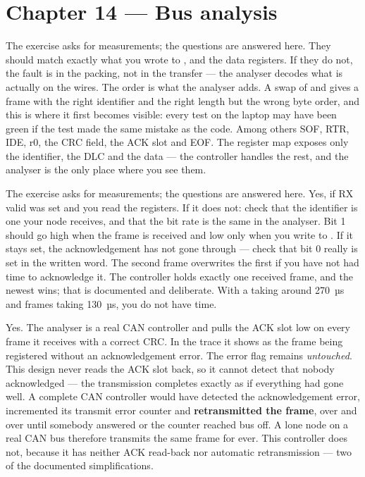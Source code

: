\section*{Chapter 14 --- Bus analysis}

The exercise asks for measurements; the questions are answered here.
 They should match exactly what you wrote to ,  and the data
registers. If they do not, the fault is in the packing, not in the transfer --- the analyser
decodes what is actually on the wires.
 The order is what the analyser adds. A swap of  and 
gives a frame with the right identifier and the right length but the wrong byte order, and this is
where it first becomes visible: every test on the laptop may have been green if the test made the
same mistake as the code.
 Among others SOF, RTR, IDE, r0, the CRC field, the ACK slot and EOF. The register map
exposes only the identifier, the DLC and the data --- the controller handles the rest, and the
analyser is the only place where you see them.

The exercise asks for measurements; the questions are answered here.
 Yes, if RX valid was set and you read the registers. If it does not: check that the
identifier is one your node receives, and that the bit rate is the same in the analyser.
 Bit 1 should go high when the frame is received and low only when you write  to
. If it stays set, the acknowledgement has not gone through --- check that bit 0
really is set in the written word.
 The second frame overwrites the first if you have not had time to acknowledge it. The
controller holds exactly one received frame, and the newest wins; that is documented and
deliberate. With a  taking around 270~µs and frames taking 130~µs, you do not have
time.

 Yes. The analyser is a real CAN controller and pulls the ACK slot low on every frame it
receives with a correct CRC. In the trace it shows as the frame being registered without an
acknowledgement error.
 The error flag remains \emph{untouched}. This design never reads the ACK slot back, so it
cannot detect that nobody acknowledged --- the transmission completes exactly as if everything had
gone well.
 A complete CAN controller would have detected the acknowledgement error, incremented its
transmit error counter and \textbf{retransmitted the frame}, over and over until somebody answered
or the counter reached bus off. A lone node on a real CAN bus therefore transmits the same frame
for ever. This controller does not, because it has neither ACK read-back nor automatic
retransmission --- two of the documented simplifications.

